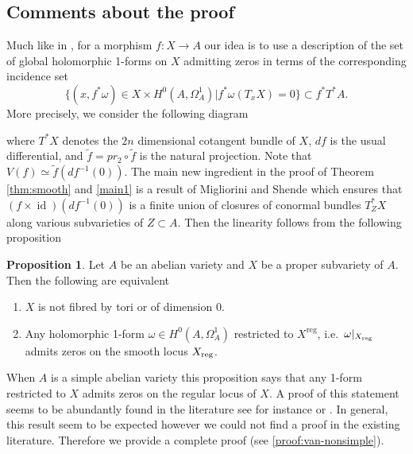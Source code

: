\documentclass[a4paper,12pt,reqno]{amsart}
\theoremstyle{plain}
\theoremstyle{definition}
\newtheorem{proposition}[theorem]{Proposition}
\theoremstyle{remark}
\newcommand{\id}{\operatorname{id}}
\newcommand{\pr}{\operatorname{pr}}
\DeclareMathOperator{\reg}{reg}
\begin{document}
\subsection{Comments about the proof}
Much like in \cite{PS14}, for a morphism $f: X\to A$ our idea is to use a description of the set of global holomorphic 1-forms
on $X$ admitting zeros
in terms of the corresponding incidence set
\[\{(x,f^*\omega)\in X\times H^0(A,\Omega_A^1)| f^*\omega(T_xX) = 0\} \subset f^*T^*A.\] More
precisely,  we consider the following diagram 
\begin{center}
\end{center}
 where $T^*X$ denotes the $2n$ dimensional 
cotangent bundle of $X$, $df$ is the usual differential, and $\tilde{f} = pr_2\circ \tilde{f}$ is the natural projection. Note that
$V(f) \simeq \tilde{f}(df^{-1}(0))$. 
The main new ingredient in the proof of
Theorem \ref{thm:smooth} and \ref{main1} is
a result of Migliorini and Shende \cite[Theorem C]{MiSh18} which ensures that $(f\times\id)(df^{-1}(0))$
is a finite union of closures of conormal bundles
$T^*_ZX$ along various subvarieties of $Z\subset A$.
Then the linearity follows from the following proposition
\begin{proposition}\label{van-nonsimple}
Let $A$ be an abelian variety and $X$ be a proper subvariety of $A$. Then the following are equivalent
\begin{enumerate}
	\item $X$ is not fibred by tori or of dimension 0. 
	\item Any holomorphic 1-form $\omega\in H^0(A, \Omega_A^1)$ restricted to $X^{\reg}$, i.e.\ $\omega|_{X_{\textnormal{reg}}}$ admits zeros on the smooth locus $X_{\textnormal{reg}}$.
\end{enumerate}
\end{proposition}
When $A$ is a
simple abelian variety this proposition says that any 1-form restricted to $X$ admits zeros on the regular locus of $X$. A proof of this statement seems to be abundantly found in the literature
see for instance \cite[Proposition 3.1]{HK05}
or \cite[Proposition 5.12]{LMW20}. In general, this result seem to be expected however we could not find a proof in the existing literature. 
Therefore we provide a complete proof (see \ref{proof:van-nonsimple}).
\end{document}
